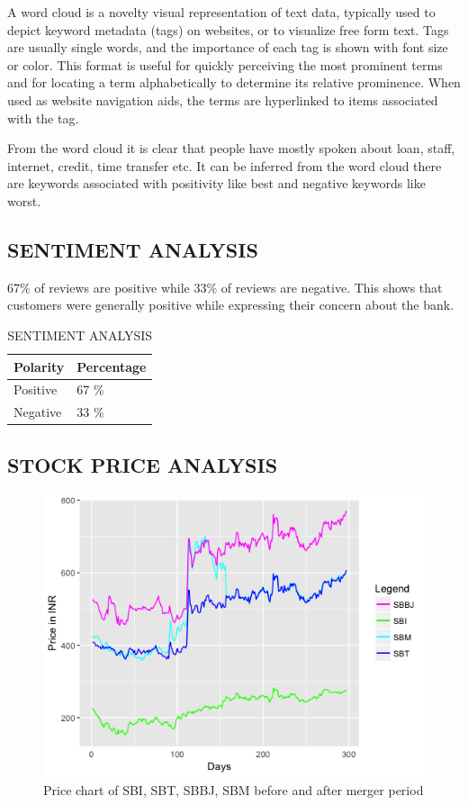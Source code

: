 \documentclass[a4paper, 12pt]{extarticle}
\begin{document}
{\par A word cloud is a novelty visual representation of text data, typically used to depict keyword metadata (tags) on websites, or to visualize free form text. Tags are usually single words, and the importance of each tag is shown with font size or color. This format is useful for quickly perceiving the most prominent terms and for locating a term alphabetically to determine its relative prominence. When used as website navigation aids, the terms are hyperlinked to items associated with the tag.

From the word cloud it is clear that people have mostly spoken about loan, staff, internet, credit, time transfer etc. It can be inferred from the word cloud there are keywords associated with positivity like best and negative keywords like worst.
\subsection{SENTIMENT ANALYSIS}
\begin{table}[H]
67\% of reviews are positive while 33\% of reviews are negative. This shows that customers were generally positive while expressing their concern about the bank.
\centering
\begin{tabularx}{\linewidth}{|X|X|}
\hline Polarity & Percentage\\
\hline Positive & 67 \% \\
\hline Negative & 33 \% \\
\hline
\end{tabularx}
\caption{SENTIMENT ANALYSIS}
\label{table:sent_analysis}
\end{table}
\subsection{STOCK PRICE ANALYSIS}
\begin{figure}[H]
\centering
\includegraphics[scale=0.8]{price_action.png}
\caption{Price chart of SBI, SBT, SBBJ, SBM before and after merger period}
\label{fig:price_action}
\end{figure}

}
\end{document}
